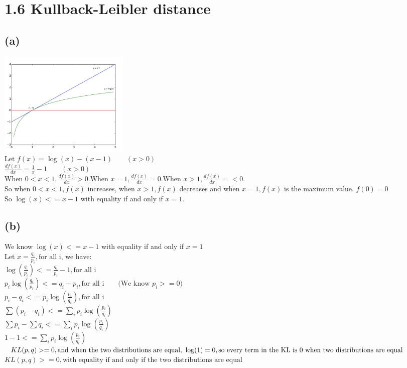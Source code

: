 \documentclass [11pt, a4paper, oneside] {article}
\begin{document}
\section *{1.6 Kullback-Leibler distance}
\subsection *{(a)}
\includegraphics[height=5cm]{figure.jpg}\\
$\textrm{Let }f(x) = \log(x) - (x-1)\qquad (x > 0)$\\
$\frac{df(x)}{dx} = \frac{1}{x} - 1\qquad (x>0)$\\
$\textrm{When }0 < x < 1, \frac{df(x)}{dx} > 0. \textrm{When }x = 1, \frac{df(x)}{dx} = 0. \textrm{When }x > 1, \frac{df(x)}{dx} = <0. $\\
So when $0 < x < 1, f(x)$ increases, when $x > 1, f(x)$ decreases and when $x=1, f(x)$ is the maximum value. $f(0) = 0$ \\
So $\log(x) <= x - 1$ with equality if and only if $x = 1$. \\
\subsection *{(b)}
We know $\log(x) <= x -1$ with equality if and only if $x = 1$\\
Let $ x = \frac{q_i}{p_i},\textrm{for all i}$, we have:\\
$\log(\frac{q_i}{p_i}) <= \frac{q_i}{p_i} - 1,  \textrm{for all i}$\\
$p_i\log(\frac{q_i}{p_i}) <= q_i - p_i,\textrm{for all i}\qquad\textrm{(We know }p_i >= 0)$\\
$p_i - q_i <= p_i\log(\frac{p_i}{q_i}), \textrm{for all i}$\\
$\sum{(p_i - q_i)} <= \sum_i{p_i\log(\frac{p_i}{q_i})}$\\
$\sum{p_i} -\sum{q_i} <= \sum_i{p_i\log(\frac{p_i}{q_i})}$\\
$1 - 1 <= \sum_i{p_i\log(\frac{p_i}{q_i})}$\\
$KL(p, q) >= 0, \textrm{and when the two distributions are equal, }\log(1) = 0, \\ \textrm{so every term in the KL is 0 when two distributions are equal}$\\
$KL(p, q) >= 0, \textrm{with equality if and only if the two distributions are equal}$\\
\end{document}
